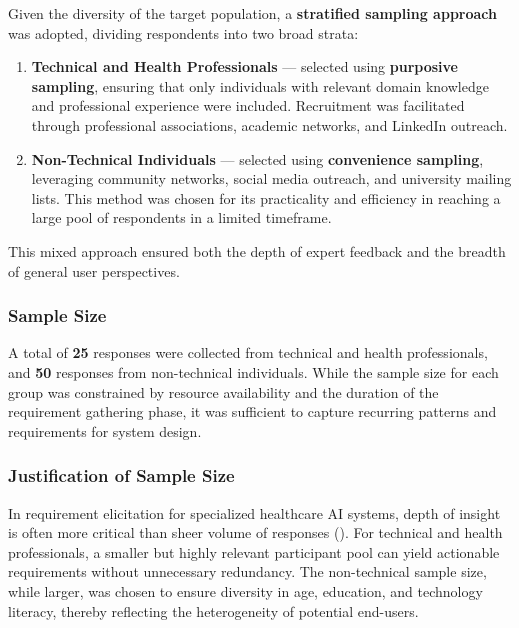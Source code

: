 \documentclass[
  12pt,
  oneside]{article}
\providecommand{\tightlist}{%
  \setlength{\itemsep}{0pt}\setlength{\parskip}{0pt}}
\begin{document}
Given the diversity of the target population, a \textbf{stratified
sampling approach} was adopted, dividing respondents into two broad
strata:

\begin{enumerate}
\def\labelenumi{\arabic{enumi}.}
\tightlist
\item
  \textbf{Technical and Health Professionals} --- selected using
  \textbf{purposive sampling}, ensuring that only individuals with
  relevant domain knowledge and professional experience were included.
  Recruitment was facilitated through professional associations,
  academic networks, and LinkedIn outreach.\\
\item
  \textbf{Non-Technical Individuals} --- selected using
  \textbf{convenience sampling}, leveraging community networks, social
  media outreach, and university mailing lists. This method was chosen
  for its practicality and efficiency in reaching a large pool of
  respondents in a limited timeframe.
\end{enumerate}

This mixed approach ensured both the depth of expert feedback and the
breadth of general user perspectives.

\subsubsection{Sample Size}\label{sample-size}

A total of \textbf{25} responses were collected from technical and
health professionals, and \textbf{50} responses from non-technical
individuals. While the sample size for each group was constrained by
resource availability and the duration of the requirement gathering
phase, it was sufficient to capture recurring patterns and requirements
for system design.

\subsubsection{Justification of Sample
Size}\label{justification-of-sample-size}

In requirement elicitation for specialized healthcare AI systems, depth
of insight is often more critical than sheer volume of responses
(). For technical
and health professionals, a smaller but highly relevant participant pool
can yield actionable requirements without unnecessary redundancy. The
non-technical sample size, while larger, was chosen to ensure diversity
in age, education, and technology literacy, thereby reflecting the
heterogeneity of potential end-users.
\end{document}
